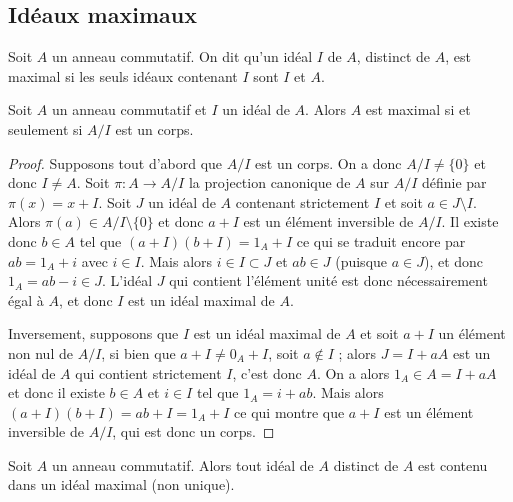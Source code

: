 \subsection{Idéaux maximaux}

\begin{de}
Soit $A$ un anneau commutatif. On dit qu'un idéal $I$ de $A$,
distinct de $A$, est maximal si les seuls idéaux contenant $I$ sont $I$ et $A$.
\end{de}

\begin{prop}
Soit $A$ un anneau commutatif et $I$ un idéal de $A$. Alors
$A$ est maximal si et seulement si $A/I$ est un corps.
\end{prop}

\begin{proof}
Supposons tout d'abord que $A/I$ est un corps. On a donc
$A/I \neq \{0\}$ et
donc $I \neq A$. Soit $\pi : A \rightarrow A/I$ la projection
canonique de $A$ sur $A/I$ définie par $\pi(x) = x + I$. Soit $J$ un idéal de $A$
contenant strictement $I$ et soit $a \in J \setminus I$. Alors $\pi(a) \in A/I \setminus \{0\}$ et donc $a + I$ est un élément
inversible de $A/I$. Il existe donc $b \in A$ tel que $(a + I)(b + I) =
1_A + I$ ce qui se traduit encore par $ab = 1_A + i$ avec
$i \in I$. Mais alors $i \in I \subset J$ et $ab \in J$ (puisque $a \in J$), et donc
$1_A = ab - i \in J$. L'idéal $J$ qui contient l'élément unité est
donc nécessairement égal à $A$, et donc $I$ est un idéal maximal de $A$.

Inversement, supposons que $I$ est un idéal maximal de $A$ et soit $a + I$ un
élément non nul de $A/I$, si bien que $a + I \neq 0_A + I$, soit
$a \notin I$ ; alors $J = I + aA$ est un idéal de $A$ qui
contient strictement $I$, c'est donc $A$. On a alors $1_A \in A = I +
aA$ et donc il existe $b \in A$ et $i \in I$ tel que $1_A = i + ab$. Mais
alors $(a + I)(b + I) = ab + I = 1_A + I$ ce qui montre que $a + I$
est un élément inversible de $A/I$, qui est donc un corps.
\end{proof}

\begin{thm}
Soit $A$ un anneau commutatif. Alors tout idéal de $A$
distinct de $A$ est contenu dans un idéal maximal (non unique).
\end{thm}

